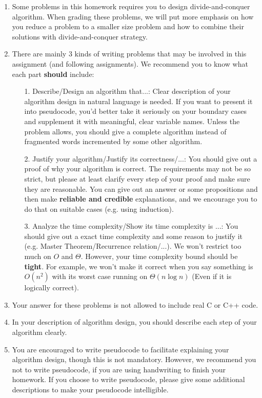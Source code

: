 \documentclass[11pt, addpoints, answers]{exam}
\begin{document}
\begin{enumerate}
	\item Some problems in this homework requires you to design divide-and-conquer algorithm. When grading these problems, we will put more emphasis on how you reduce a problem to a smaller size problem and how to combine their solutions with divide-and-conquer strategy. 
	\item There are mainly $3$ kinds of writing problems that may be involved in this assignment (and following assignments).
    We recommend you to know what each part {\color{red}\textbf{should}} include:
	\begin{enumerate}
        \item [1.] Describe/Design an algorithm that...: Clear description of your algorithm design in natural language is needed. If you want to present it into pseudocode, you'd better take it seriously on your boundary cases and supplement it with meaningful, clear variable names. Unless the problem allows, you should give a complete algorithm instead of fragmented words incremented by some other algorithm.
        \item [2.] Justify your algorithm/Justify its correctness/...: You should give out a proof of why your algorithm is correct. The requirements may not be so strict, but please at least clarify every step of your proof and make sure they are reasonable. You can give out an answer or some propositions and then make \textbf{reliable and credible} explanations, and we encourage you to do that on suitable cases (e.g. using induction).
        \item [3.] Analyze the time complexity/Show its time complexity is ...: You should give out a exact time complexity and some reason to justify it (e.g. Master Theorem/Recurrence relation/...). We won't restrict too much on $O$ and $\Theta$. However, your time complexity bound should be \textbf{tight}. For example, we won't make it correct when you say something is $O(n^2)$ with its worst case running on $\Theta(n\log n)$ (Even if it is logically correct).
	\end{enumerate}
    \item Your answer for these problems is {\color{red}not allowed to include real C or C++ code}.
	\item In your description of algorithm design, you should describe each step of your algorithm clearly.
	\item You are encouraged to write pseudocode to facilitate explaining your algorithm design, though this is not mandatory. However, we recommend you not to write pseudocode, if you are using handwriting to finish your homework. If you choose to write pseudocode, please give some additional descriptions to make your pseudocode intelligible.

\end{enumerate}
\end{document}
